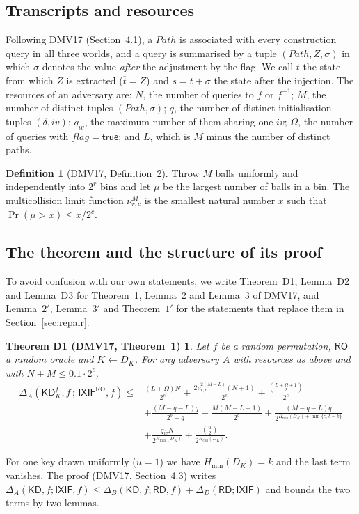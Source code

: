 \documentclass[11pt,a4paper]{article}
\newtheorem*{thmD}{Theorem D1 {\normalfont (DMV17, Theorem~1)}}
\theoremstyle{definition}
\newtheorem{definition}{Definition}
\theoremstyle{remark}
\newcommand{\KD}{\mathsf{KD}}
\newcommand{\RD}{\mathsf{RD}}
\newcommand{\IXIF}{\mathsf{IXIF}}
\newcommand{\RO}{\mathsf{RO}}
\newcommand{\Path}{\mathit{Path}}
\newcommand{\flag}{\mathit{flag}}
\newcommand{\true}{\mathsf{true}}
\newcommand{\outp}[1]{\overline{#1}}
\newcommand{\Hmin}{H_{\min}}
\newcommand{\Hcoll}{H_{\mathrm{coll}}}
\begin{document}
\subsection{Transcripts and resources}
Following DMV17 (Section~4.1), a $\Path$ is associated with every construction query in all three worlds, and a
query is summarised by a tuple $(\Path, Z, \sigma)$ in which $\sigma$ denotes the value \emph{after} the adjustment by
the flag. We call $t$ the state from which $Z$ is extracted ($\outp{t} = Z$) and $s = t + \sigma$ the state after the
injection. The resources of an adversary are:
$N$, the number of queries to $f$ or $f^{-1}$; $M$, the number of distinct tuples $(\Path, \sigma)$;
$q$, the number of distinct initialisation tuples $(\delta, iv)$; $q_{iv}$, the maximum number of them sharing one
$iv$; $\Omega$, the number of queries with $\flag = \true$; and $L$, which is $M$ minus the number of distinct paths.

\begin{definition}[DMV17, Definition~2]
Throw $M$ balls uniformly and independently into $2^r$ bins and let $\mu$ be the largest number of balls in a bin.
The multicollision limit function $\nu^M_{r,c}$ is the smallest natural number $x$ such that $\Pr(\mu > x) \le x/2^c$.
\end{definition}

\subsection{The theorem and the structure of its proof}
To avoid confusion with our own statements, we write Theorem~D1, Lemma~D2 and Lemma~D3 for Theorem~1, Lemma~2 and
Lemma~3 of DMV17, and Lemma~$2'$, Lemma~$3'$ and Theorem~$1'$ for the statements that replace them in Section~\ref{sec:repair}.
\begin{thmD}
Let $f$ be a random permutation, $\RO$ a random oracle and $K \leftarrow D_K$. For any adversary $A$ with resources as
above and with $N + M \le 0.1 \cdot 2^c$,
\begin{align*}
\Delta_A(\KD^f_K, f \,;\, \IXIF^{\RO}, f) \le{}& \frac{(L+\Omega)N}{2^c} + \frac{2\nu^{2(M-L)}_{r,c}(N+1)}{2^c}
 + \frac{\binom{L+\Omega+1}{2}}{2^c} \\
&+ \frac{(M-q-L)q}{2^b-q} + \frac{M(M-L-1)}{2^b} + \frac{(M-q-L)q}{2^{\Hmin(D_K)+\min\{c,\,b-k\}}} \\
&+ \frac{q_{iv}N}{2^{\Hmin(D_K)}} + \frac{\binom{u}{2}}{2^{\Hcoll(D_K)}} .
\end{align*}
\end{thmD}
For one key drawn uniformly ($u = 1$) we have $\Hmin(D_K) = k$ and the last term vanishes.
The proof (DMV17, Section~4.3) writes
$\Delta_A(\KD, f ; \IXIF, f) \le \Delta_B(\KD, f ; \RD, f) + \Delta_D(\RD ; \IXIF)$ and bounds the two terms by two lemmas.
\end{document}
